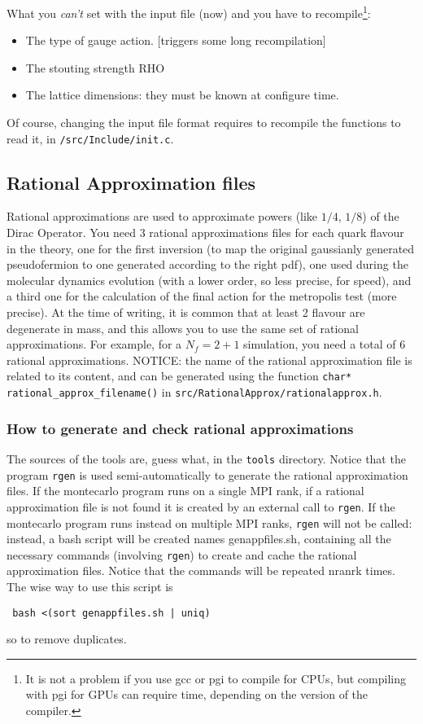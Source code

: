What you \emph{can't} set with the input file (now) and you have to
recompile\footnote{ It is not a problem if you use gcc or pgi to compile for 
    CPUs, but compiling with pgi for GPUs can require time, depending on the
version of the compiler.}:
\begin{itemize}
    \item The type of gauge action. [triggers some long recompilation]
    \item The stouting strength RHO 
    \item The lattice dimensions: they must be known at \textsf{ configure} time.
\end{itemize}
Of course, changing the input file format requires to recompile the functions 
to read it, in \verb|/src/Include/init.c|.

\subsection{ Rational Approximation files}
Rational approximations are used to approximate powers (like $1/4$,
$1/8$) of the Dirac Operator.
You need $3$ rational approximations files for each quark flavour in the
theory, one for the first inversion (to map the original
gaussianly generated pseudofermion to one generated according to the
right pdf), one used during the molecular dynamics evolution (with a
lower order, so less precise, for speed), and a third one for the
calculation of the final action for the metropolis test (more
precise). At the time of writing, it is common that at least 2 flavour are 
degenerate in mass, and this allows you to use the same set of rational
approximations. For example, for a $N_f=2+1$ simulation, you need a total
of 6 rational approximations.
NOTICE: the name of the rational approximation file is related to
its content, and can be generated using the function
\verb|char* rational_approx_filename()| in
\verb|src/RationalApprox/rationalapprox.h|.

\subsubsection{ How to generate and check rational approximations}
The sources of the tools are, guess what, in  the \verb|tools| directory.
Notice that the program \verb|rgen| is used semi-automatically to generate the 
rational approximation files. If the montecarlo program runs on a single MPI rank, 
if a rational approximation file is not found it is created by an external call to \verb|rgen|.
If the montecarlo program runs instead on multiple MPI ranks, \verb|rgen| will not be called: 
instead, a bash script will be created names \textsf{ genappfiles.sh}, containing all the necessary commands (involving \verb|rgen|)
to create and cache the rational approximation files. Notice that the commands 
will be repeated \textsf{ nranrk} times. The wise way to use this script is 
\begin{verbatim}
 bash <(sort genappfiles.sh | uniq)
\end{verbatim}
so to remove duplicates.

